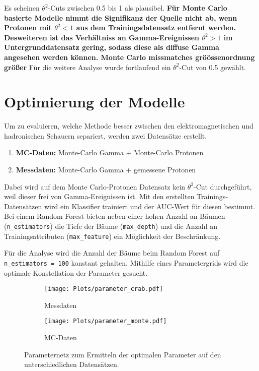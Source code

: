 Es scheinen $\theta^{2}$-Cuts zwischen \num{0.5} bis \num{1} als plausibel. 
\textbf{Für Monte Carlo basierte Modelle nimmt die Signifikanz der Quelle nicht ab, wenn Protonen mit $\theta^{2} < 1$ aus dem Trainingsdatensatz entfernt werden. 
Desweiteren ist das Verhältniss an Gamma-Ereignissen $\theta^{2} > 1$ im Untergrunddatensatz gering, sodass diese als diffuse Gamma angesehen werden können. Monte Carlo missmatches gröössenordnung größer} 
Für die weitere Analyse wurde fortlaufend ein $\theta^{2}$-Cut von \num{0.5} gewählt. 
\section{Optimierung der Modelle}
Um zu evaluieren, welche Methode besser zwischen den elektromagnetischen und hadronischen Schauern separiert, werden zwei Datensätze erstellt. 
\begin{enumerate}
  \item \textbf{MC-Daten:} Monte-Carlo Gamma + Monte-Carlo Protonen
  \item \textbf{Messdaten:} Monte-Carlo Gamma + gemessene Protonen 
\end{enumerate}
Dabei wird auf dem Monte Carlo-Protonen Datensatz kein $\theta^{2}$-Cut durchgeführt, weil dieser frei von Gamma-Ereignissen ist.
Mit den erstellten Trainings-Datensätzen wird ein Klassifier trainiert und der AUC-Wert für diesen bestimmt.
Bei einem Random Forest bieten neben einer hohen Anzahl an Bäumen (\texttt{n\_estimators}) die Tiefe der Bäume (\texttt{max\_depth}) und die Anzahl an Trainingsattributen (\texttt{max\_feature}) ein Möglichkeit der Beschränkung.

Für die Analyse wird die Anzahl der Bäume beim Random Forest auf \texttt{n\_estimators = 100} konstant gehalten. 
Mithilfe eines Parametergrids wird die optimale Konstellation der Parameter gesucht. 
\begin{figure}
  \begin{subfigure}[b]{0.5\textwidth}
	\texttt{[image: Plots/parameter\_crab.pdf]}
	\caption{Messdaten}
	\label{fig:messGrid}
  \end{subfigure}
  \begin{subfigure}[b]{0.5\textwidth}
	\texttt{[image: Plots/parameter\_monte.pdf]}
	\caption{MC-Daten}
	\label{fig:mcGrid}
  \end{subfigure}
  \caption{Parameternetz zum Ermitteln der optimalen Parameter auf den unterschiedlichen Datensätzen.}
\end{figure}

